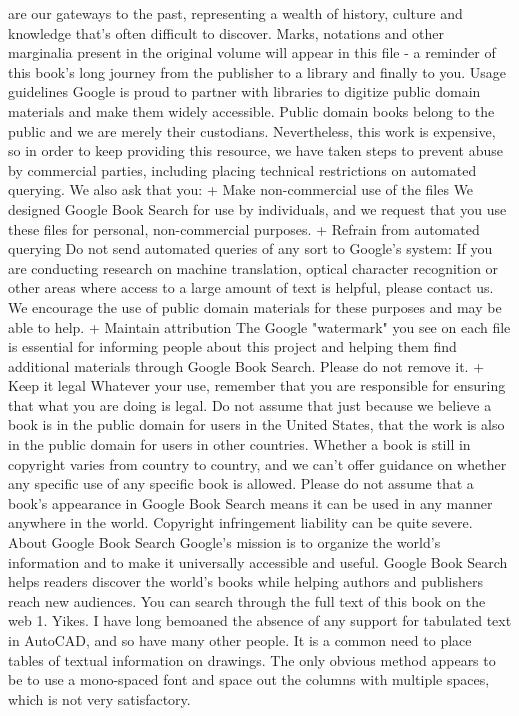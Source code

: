 \documentclass[a4paper]{article}
\begin{document}
are our gateways to the past, representing a wealth of history, culture and knowledge that's often difficult to discover. 
Marks, notations and other marginalia present in the original volume will appear in this file - a reminder of this book's long journey from the 
publisher to a library and finally to you. 
Usage guidelines 
Google is proud to partner with libraries to digitize public domain materials and make them widely accessible. Public domain books belong to the 
public and we are merely their custodians. Nevertheless, this work is expensive, so in order to keep providing this resource, we have taken steps to 
prevent abuse by commercial parties, including placing technical restrictions on automated querying. 
We also ask that you: 
+ Make non-commercial use of the files We designed Google Book Search for use by individuals, and we request that you use these files for 
personal, non-commercial purposes. 
+ Refrain from automated querying Do not send automated queries of any sort to Google's system: If you are conducting research on machine 
translation, optical character recognition or other areas where access to a large amount of text is helpful, please contact us. We encourage the 
use of public domain materials for these purposes and may be able to help. 
+ Maintain attribution The Google "watermark" you see on each file is essential for informing people about this project and helping them find 
additional materials through Google Book Search. Please do not remove it. 
+ Keep it legal Whatever your use, remember that you are responsible for ensuring that what you are doing is legal. Do not assume that just 
because we believe a book is in the public domain for users in the United States, that the work is also in the public domain for users in other 
countries. Whether a book is still in copyright varies from country to country, and we can't offer guidance on whether any specific use of 
any specific book is allowed. Please do not assume that a book's appearance in Google Book Search means it can be used in any manner 
anywhere in the world. Copyright infringement liability can be quite severe. 
About Google Book Search 
Google's mission is to organize the world's information and to make it universally accessible and useful. Google Book Search helps readers 
discover the world's books while helping authors and publishers reach new audiences. You can search through the full text of this book on the web 1. Yikes. I have long bemoaned the absence of any support for tabulated text in AutoCAD, and so have many other people. It is a common need to place tables of textual information on drawings. The only obvious method appears to be to use a mono-spaced font and space out the columns with multiple spaces, which is not very satisfactory.
\end{document}
